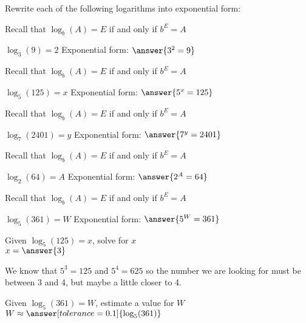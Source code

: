 \documentclass{ximera}
\author{Lee Wayand}
\begin{document}
\begin{example}


\begin{question}

Rewrite each of the following logarithms into exponential form:
\begin{hint}
	Recall that $\log_b(A)=E$ if and only if $b^E=A$
\end{hint}
$\log_3(9)=2$  \qquad Exponential form:  $\answer{3^2=9}$  \\
\begin{hint}
	Recall that $\log_b(A)=E$ if and only if $b^E=A$
\end{hint}
$\log_5(125)=x$  \qquad Exponential form:  $\answer{5^x=125}$  \\
\begin{hint}
	Recall that $\log_b(A)=E$ if and only if $b^E=A$
\end{hint}
$\log_7(2401)=y$  \qquad Exponential form:  $\answer{7^y=2401}$  \\
\begin{hint}
	Recall that $\log_b(A)=E$ if and only if $b^E=A$
\end{hint}
$\log_2(64)=A$  \qquad Exponential form:  $\answer{2^A=64} $ \\
\begin{hint}
	Recall that $\log_b(A)=E$ if and only if $b^E=A$
\end{hint}
$\log_5(361)=W$  \qquad Exponential form: $ \answer{5^W=361} $ \\


\end{question}




\begin{question}

Given $\log_5(125)=x$, solve for $x$ \\

$x=\answer{3}$

\end{question}


\begin{question}
	
\begin{hint}
	We know that $5^3=125$ and $5^4=625$ so the number we are looking for must be between 3 and 4, but maybe a little closer to 4.
\end{hint}
Given $\log_5(361)=W$, estimate a value for $W$ \\

$W \approx \answer[tolerance=0.1]{\log_5(361)}$


\end{question}
\end{example}
\end{document}
